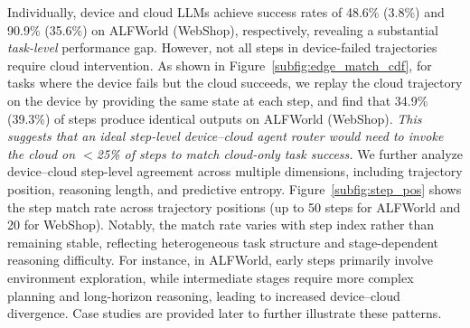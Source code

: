 \documentclass{article}
\newcommand{\needrev}[1]{{\color{darkgreen}#1}} %
\newcommand{\needrev}[1]{#1} %
\begin{document}
Individually, device and cloud LLMs achieve success rates of 48.6\% (3.8\%) and 90.9\% (35.6\%) on ALFWorld (WebShop), respectively, revealing a substantial \textit{task-level} performance gap.
However, not all steps in device-failed trajectories require cloud intervention.
As shown in Figure~\ref{subfig:edge_match_cdf}, for tasks where the device fails but the cloud succeeds, we replay the cloud trajectory on the device by providing the same state at each step, and find that 34.9\% (39.3\%) of steps produce identical outputs on ALFWorld (WebShop).
\textit{This suggests that an ideal step-level device--cloud agent router would need to invoke the cloud on $<$25\% of steps to match cloud-only task success.}
We further analyze device--cloud step-level agreement across multiple dimensions, including trajectory position, reasoning length, and predictive entropy.
Figure~\ref{subfig:step_pos} shows the step match rate across trajectory positions (up to 50 steps for ALFWorld and 20 for WebShop).
Notably, the match rate varies with step index rather than remaining stable, reflecting heterogeneous task structure and stage-dependent reasoning difficulty.
For instance, in ALFWorld, early steps primarily involve environment exploration, while intermediate stages require more complex planning and long-horizon reasoning, leading to increased device--cloud divergence. Case studies are provided later to further illustrate these patterns.
\end{document}
